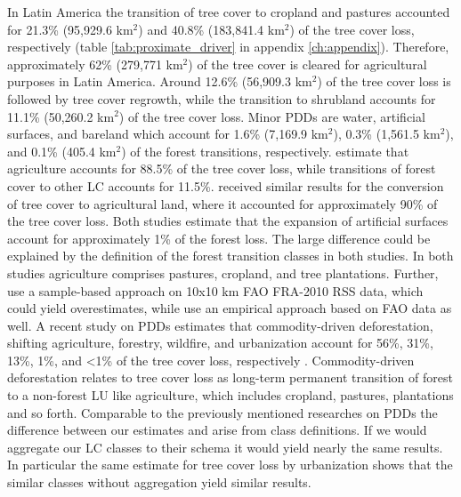 			In Latin America the transition of tree cover to cropland and pastures accounted for 21.3\% (95,929.6 km$^2$) and 40.8\% (183,841.4 km$^2$) of the tree cover loss, respectively (table \ref{tab:proximate_driver} in appendix \ref{ch:appendix}). Therefore, approximately 62\% (279,771 km$^2$) of the tree cover is cleared for agricultural purposes in Latin America. Around 12.6\% (56,909.3 km$^2$) of the tree cover loss is followed by tree cover regrowth, while the transition to shrubland accounts for 11.1\% (50,260.2 km$^2$) of the tree cover loss. Minor \acp{PDD} are water, artificial surfaces, and bareland which account for 1.6\% (7,169.9 km$^2$), 0.3\% (1,561.5 km$^2$), and 0.1\% (405.4 km$^2$) of the forest transitions, respectively. \citet{Sy2015} estimate that agriculture accounts for 88.5\% of the tree cover loss, while transitions of forest cover to other \ac{LC} accounts for 11.5\%. \citet{Hosonuma2012} received similar results for the conversion of tree cover to agricultural land, where it accounted for approximately 90\% of the tree cover loss. Both studies estimate that the expansion of artificial surfaces account for approximately 1\% of the forest loss. The large difference could be explained by the definition of the forest transition classes in both studies. In both studies agriculture comprises pastures, cropland, and tree plantations. Further, \citet{Sy2015} use a sample-based approach on 10x10 km \ac{FAO} FRA-2010 RSS data, which could yield overestimates, while \citet{Hosonuma2012} use an empirical approach based on \ac{FAO} data as well. A recent study on \acp{PDD} estimates that commodity-driven deforestation, shifting agriculture, forestry, wildfire, and urbanization account for 56\%, 31\%, 13\%, 1\%, and <1\% of the tree cover loss, respectively \citep{Curtis2018}. Commodity-driven deforestation relates to tree cover loss as long-term permanent transition of forest to a non-forest \ac{LU} like agriculture, which includes cropland, pastures, plantations and so forth. Comparable to the previously mentioned researches on \acp{PDD} the difference between our estimates and \citet{Curtis2018} arise from class definitions. If we would aggregate our \ac{LC} classes to their schema it would yield nearly the same results. In particular the same estimate for tree cover loss by urbanization shows that the similar classes without aggregation yield similar results. 

